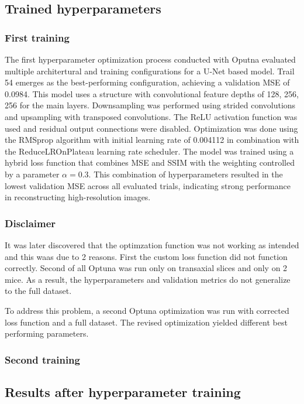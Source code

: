 \documentclass[twocolumn]{article}
\begin{document}
\subsection{Trained hyperparameters}
\subsubsection{First training}
The first hyperparameter optimization process conducted with Oputna evaluated multiple architertural and training configurations for a U-Net based model. 
Trail 54 emerges as the best-performing configuration, achieving a validation MSE of 0.0984. 
This model uses a structure with convolutional feature depths of 128, 256, 256 for the main layers. 
Downsampling was performed using strided convolutions and upsampling with transposed convolutions. 
The ReLU activation function was used and residual output connections were disabled. 
Optimization was done using the RMSprop algorithm with initial learning rate of 0.004112 in combination with the ReduceLROnPlateau learning rate scheduler. 
The model was trained using a hybrid loss function that combines MSE and SSIM with the weighting controlled by a parameter $\alpha=0.3$.
This combination of hyperparameters resulted in the lowest validation MSE across all evaluated trials, indicating strong performance in reconstructing high-resolution images. 

\subsubsection{Disclaimer}
It was later discovered that the optimzation function was not working as intended and this waas due to 2 reasons.
First the custom loss function did not function correctly. Second of all Optuna was run only on transaxial slices and only on 2 mice. 
As a result, the hyperparameters and validation metrics do not generalize to the full dataset. 

To address this problem, a second Optuna optimization was run with corrected loss function and a full dataset. 
The revised optimization yielded different best performing parameters. 

\subsubsection{Second training}


\subsection{Results after hyperparameter training}
\end{document}
